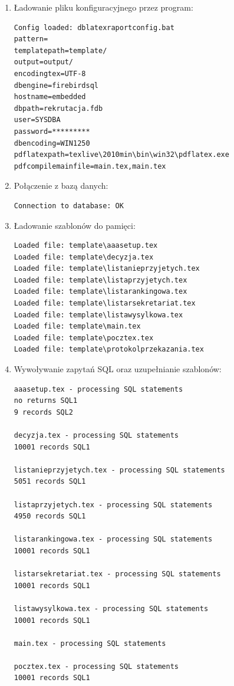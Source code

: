 \begin{enumerate}
\item Ładowanie pliku konfiguracyjnego przez program:
\begin{lstlisting}
Config loaded: dblatexraportconfig.bat
pattern=
templatepath=template/
output=output/
encodingtex=UTF-8
dbengine=firebirdsql
hostname=embedded
dbpath=rekrutacja.fdb
user=SYSDBA
password=*********
dbencoding=WIN1250
pdflatexpath=texlive\2010min\bin\win32\pdflatex.exe
pdfcompilemainfile=main.tex,main.tex
 \end{lstlisting}
 
 \item Połączenie z bazą danych:
\begin{lstlisting}
Connection to database: OK
 \end{lstlisting}
 
  \item Ładowanie szablonów do pamięci:
\begin{lstlisting}
Loaded file: template\aaasetup.tex
Loaded file: template\decyzja.tex
Loaded file: template\listanieprzyjetych.tex
Loaded file: template\listaprzyjetych.tex
Loaded file: template\listarankingowa.tex
Loaded file: template\listarsekretariat.tex
Loaded file: template\listawysylkowa.tex
Loaded file: template\main.tex
Loaded file: template\pocztex.tex
Loaded file: template\protokolprzekazania.tex
 \end{lstlisting}
 
   \item Wywoływanie zapytań SQL oraz uzupełnianie szablonów:
 \begin{lstlisting}
aaasetup.tex - processing SQL statements
no returns SQL1
9 records SQL2

decyzja.tex - processing SQL statements
10001 records SQL1

listanieprzyjetych.tex - processing SQL statements
5051 records SQL1

listaprzyjetych.tex - processing SQL statements
4950 records SQL1

listarankingowa.tex - processing SQL statements
10001 records SQL1

listarsekretariat.tex - processing SQL statements
10001 records SQL1

listawysylkowa.tex - processing SQL statements
10001 records SQL1

main.tex - processing SQL statements

pocztex.tex - processing SQL statements
10001 records SQL1


\end{lstlisting}
\end{enumerate}
